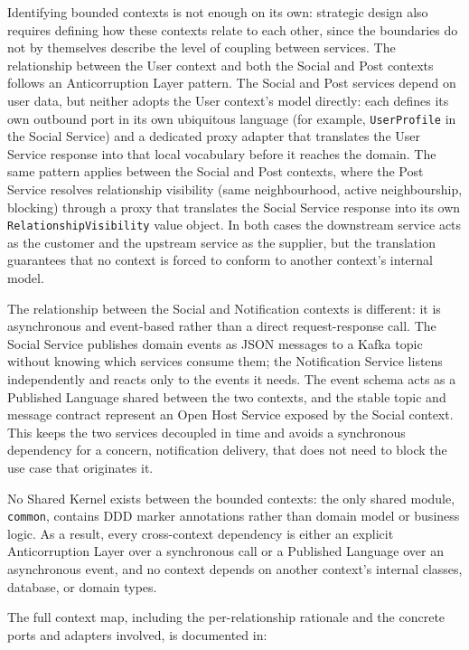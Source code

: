\documentclass[12pt,a4paper]{article}
\begin{document}
Identifying bounded contexts is not enough on its own: strategic design also requires defining how these contexts relate to each other, since the boundaries do not by themselves describe the level of coupling between services. The relationship between the User context and both the Social and Post contexts follows an Anticorruption Layer pattern. The Social and Post services depend on user data, but neither adopts the User context's model directly: each defines its own outbound port in its own ubiquitous language (for example, \texttt{UserProfile} in the Social Service) and a dedicated proxy adapter that translates the User Service response into that local vocabulary before it reaches the domain. The same pattern applies between the Social and Post contexts, where the Post Service resolves relationship visibility (same neighbourhood, active neighbourship, blocking) through a proxy that translates the Social Service response into its own \texttt{RelationshipVisibility} value object. In both cases the downstream service acts as the customer and the upstream service as the supplier, but the translation guarantees that no context is forced to conform to another context's internal model.

The relationship between the Social and Notification contexts is different: it is asynchronous and event-based rather than a direct request-response call. The Social Service publishes domain events as JSON messages to a Kafka topic without knowing which services consume them; the Notification Service listens independently and reacts only to the events it needs. The event schema acts as a Published Language shared between the two contexts, and the stable topic and message contract represent an Open Host Service exposed by the Social context. This keeps the two services decoupled in time and avoids a synchronous dependency for a concern, notification delivery, that does not need to block the use case that originates it.

No Shared Kernel exists between the bounded contexts: the only shared module, \texttt{common}, contains DDD marker annotations rather than domain model or business logic. As a result, every cross-context dependency is either an explicit Anticorruption Layer over a synchronous call or a Published Language over an asynchronous event, and no context depends on another context's internal classes, database, or domain types.

The full context map, including the per-relationship rationale and the concrete ports and adapters involved, is documented in:
\end{document}
